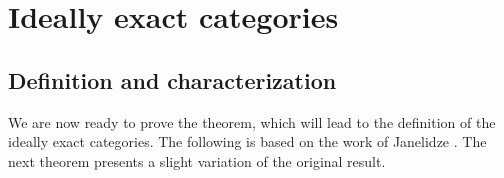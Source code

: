 \chapter{Ideally exact categories}

\label{chap:ideally-ex}

\fontsize{12}{14.5}\selectfont

\section{Definition and characterization}

We are now ready to prove the theorem, which will lead to the definition of the ideally exact categories. The following is based on the work of Janelidze \cite{Janelidze2024}. The next theorem presents a slight variation of the original result.

